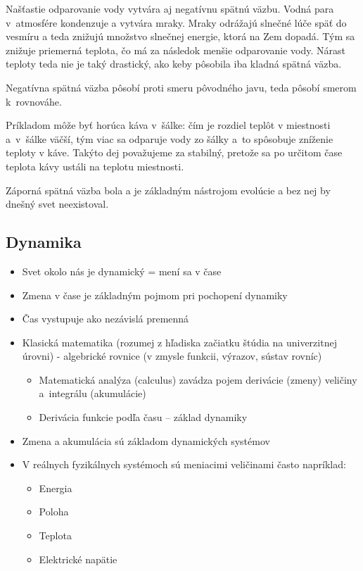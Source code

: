 \documentclass[a4paper, 10pt, ]{article}
\begin{document}
Našťastie odparovanie vody vytvára aj negatívnu spätnú väzbu. Vodná para v~atmosfére kondenzuje a vytvára mraky. Mraky odrážajú slnečné lúče späť do vesmíru a teda znižujú množstvo slnečnej energie, ktorá na Zem dopadá. Tým sa znižuje priemerná teplota, čo má za následok menšie odparovanie vody. Nárast teploty teda nie je taký drastický, ako keby pôsobila iba kladná spätná väzba.


\bigskip

\noindent
Negatívna spätná väzba pôsobí proti smeru pôvodného javu, teda pôsobí smerom k~rovnováhe.

Príkladom môže byť horúca káva v~šálke: čím je rozdiel teplôt v miestnosti a~v~šálke väčší, tým viac sa odparuje vody zo šálky a~to spôsobuje zníženie teploty v káve. Takýto dej považujeme za stabilný, pretože sa po určitom čase teplota kávy ustáli na teplotu miestnosti.

\medskip

\noindent
Záporná spätná väzba bola a je základným nástrojom evolúcie a bez nej by dnešný svet neexistoval.





\subsection{Dynamika}

\begin{itemize}[leftmargin=0pt, labelsep=3mm, itemsep=0pt]
    \item Svet okolo nás je dynamický = mení sa v čase
    \item Zmena v čase je základným pojmom pri pochopení dynamiky
    \item Čas vystupuje ako nezávislá premenná
    \item Klasická matematika (rozumej z hľadiska začiatku štúdia na univerzitnej úrovni) - algebrické rovnice (v zmysle funkcii, výrazov, sústav rovníc)
    \begin{itemize}
        \item Matematická analýza (calculus) zavádza pojem derivácie (zmeny) veličiny a~integrálu (akumulácie)
        \item Derivácia funkcie podľa času – základ dynamiky
    \end{itemize}
    \item Zmena a akumulácia sú základom dynamických systémov
    \item V reálnych fyzikálnych systémoch sú meniacimi veličinami často napríklad:
    \begin{itemize}
        \item Energia
        \item Poloha
        \item Teplota
        \item Elektrické napätie
    \end{itemize}
\end{itemize}
\end{document}
